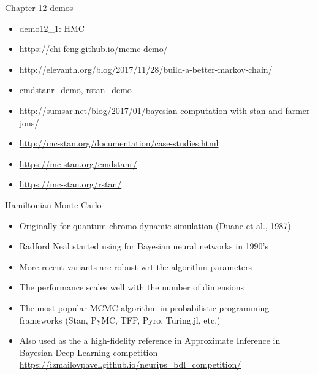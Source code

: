 \documentclass[finnish,english,t]{beamer}
\begin{document}
\begin{frame}{Chapter 12 demos}

  \begin{itemize}
  \item demo12\_1: HMC
  \item \url{https://chi-feng.github.io/mcmc-demo/}
  \item \url{http://elevanth.org/blog/2017/11/28/build-a-better-markov-chain/}
  \item cmdstanr\_demo, rstan\_demo
  \item \url{http://sumsar.net/blog/2017/01/bayesian-computation-with-stan-and-farmer-jons/}
  \item \url{http://mc-stan.org/documentation/case-studies.html}
  \item \url{https://mc-stan.org/cmdstanr/}
  \item \url{https://mc-stan.org/rstan/}
  \end{itemize}
  
\end{frame}

\begin{frame}{Hamiltonian Monte Carlo}

  \begin{itemize}
  \item<+-> Originally for quantum-chromo-dynamic simulation (Duane et
    al., 1987)
  \item<+-> Radford Neal started using for Bayesian neural networks in 1990's
  \item<+-> More recent variants are robust wrt the algorithm parameters
  \item<+-> The performance scales well with the number of dimensions
  \item<+-> The most popular MCMC algorithm in probabilistic programming
    frameworks (Stan, PyMC, TFP, Pyro, Turing.jl, etc.)
  \item<+-> Also used as the a high-fidelity reference in Approximate
    Inference in Bayesian Deep Learning competition
    \url{https://izmailovpavel.github.io/neurips_bdl_competition/}
  \end{itemize}
  
\end{frame}
\end{document}
